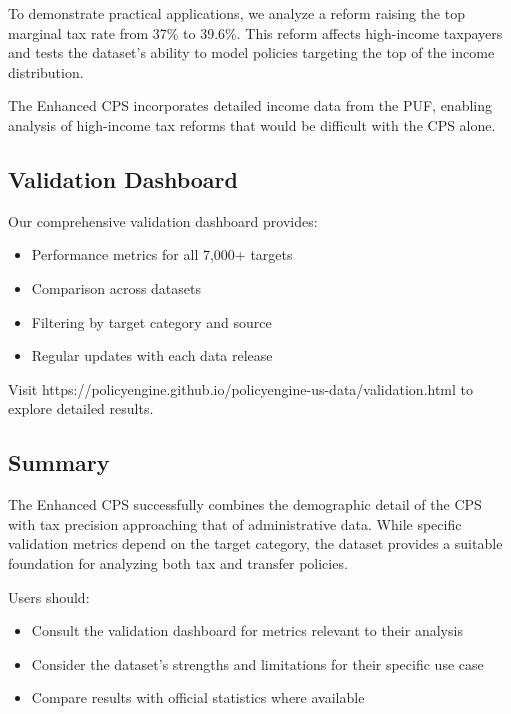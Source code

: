 To demonstrate practical applications, we analyze a reform raising the top marginal tax rate from 37\% to 39.6\%. This reform affects high-income taxpayers and tests the dataset's ability to model policies targeting the top of the income distribution.

The Enhanced CPS incorporates detailed income data from the PUF, enabling analysis of high-income tax reforms that would be difficult with the CPS alone.

\subsection{Validation Dashboard}

Our comprehensive validation dashboard provides:
\begin{itemize}
\item Performance metrics for all 7,000+ targets
\item Comparison across datasets
\item Filtering by target category and source
\item Regular updates with each data release
\end{itemize}

Visit https://policyengine.github.io/policyengine-us-data/validation.html to explore detailed results.

\subsection{Summary}

The Enhanced CPS successfully combines the demographic detail of the CPS with tax precision approaching that of administrative data. While specific validation metrics depend on the target category, the dataset provides a suitable foundation for analyzing both tax and transfer policies.

Users should:
\begin{itemize}
\item Consult the validation dashboard for metrics relevant to their analysis
\item Consider the dataset's strengths and limitations for their specific use case
\item Compare results with official statistics where available
\end{itemize}